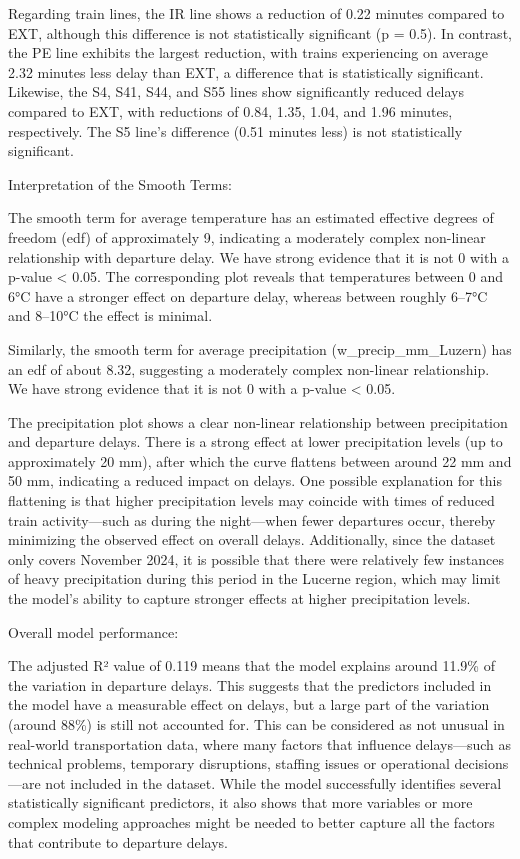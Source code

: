\documentclass[
]{article}
\begin{document}
Regarding train lines, the IR line shows a reduction of 0.22 minutes
compared to EXT, although this difference is not statistically
significant (p = 0.5). In contrast, the PE line exhibits the largest
reduction, with trains experiencing on average 2.32 minutes less delay
than EXT, a difference that is statistically significant. Likewise, the
S4, S41, S44, and S55 lines show significantly reduced delays compared
to EXT, with reductions of 0.84, 1.35, 1.04, and 1.96 minutes,
respectively. The S5 line's difference (0.51 minutes less) is not
statistically significant.

Interpretation of the Smooth Terms:

The smooth term for average temperature has an estimated effective
degrees of freedom (edf) of approximately 9, indicating a moderately
complex non-linear relationship with departure delay. We have strong
evidence that it is not 0 with a p-value \textless{} 0.05. The
corresponding plot reveals that temperatures between 0 and 6°C have a
stronger effect on departure delay, whereas between roughly 6--7°C and
8--10°C the effect is minimal.

Similarly, the smooth term for average precipitation
(w\_precip\_mm\_Luzern) has an edf of about 8.32, suggesting a
moderately complex non-linear relationship. We have strong evidence that
it is not 0 with a p-value \textless{} 0.05.

The precipitation plot shows a clear non-linear relationship between
precipitation and departure delays. There is a strong effect at lower
precipitation levels (up to approximately 20 mm), after which the curve
flattens between around 22 mm and 50 mm, indicating a reduced impact on
delays. One possible explanation for this flattening is that higher
precipitation levels may coincide with times of reduced train
activity---such as during the night---when fewer departures occur,
thereby minimizing the observed effect on overall delays. Additionally,
since the dataset only covers November 2024, it is possible that there
were relatively few instances of heavy precipitation during this period
in the Lucerne region, which may limit the model's ability to capture
stronger effects at higher precipitation levels.

Overall model performance:

The adjusted R² value of 0.119 means that the model explains around
11.9\% of the variation in departure delays. This suggests that the
predictors included in the model have a measurable effect on delays, but
a large part of the variation (around 88\%) is still not accounted for.
This can be considered as not unusual in real-world transportation data,
where many factors that influence delays---such as technical problems,
temporary disruptions, staffing issues or operational decisions---are
not included in the dataset. While the model successfully identifies
several statistically significant predictors, it also shows that more
variables or more complex modeling approaches might be needed to better
capture all the factors that contribute to departure delays.
\end{document}
